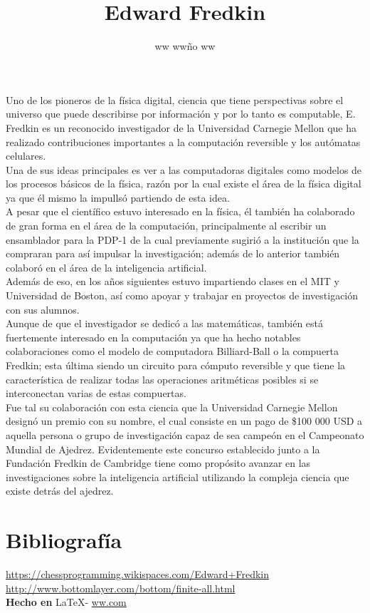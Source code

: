 \documentclass{article}
\title{Edward Fredkin}
\author{ww ww\~no ww}
\date{} %
\begin{document}
	\maketitle
	\normalsize{
Uno de los pioneros de la física digital, ciencia que tiene perspectivas sobre el universo que puede describirse por información y por lo tanto es computable, E. Fredkin es un reconocido investigador de la Universidad Carnegie Mellon que ha realizado contribuciones importantes a la computación reversible y los autómatas celulares.
\\

Una de sus ideas principales es ver a las computadoras digitales como modelos de los procesos básicos de la física, razón por la cual existe el área de la física digital ya que él mismo la impullsó partiendo de esta idea.
\\

A pesar que el científico estuvo interesado en la física, él también ha colaborado de gran forma en el área de la computación, principalmente al escribir un ensamblador para la PDP-1 de la cual previamente sugirió a la institución que la compraran para así impulsar la investigación; además de lo anterior también colaboró en el área de la inteligencia artificial.
\\

Además de eso, en los años siguientes estuvo impartiendo clases en el MIT y Universidad de Boston, así como apoyar y trabajar en proyectos de investigación con sus alumnos.
\\

Aunque de que el investigador se dedicó a las matemáticas, también está fuertemente interesado en la computación ya que ha hecho notables colaboraciones como el modelo de  computadora Billiard-Ball o la compuerta Fredkin; esta última siendo un circuito para cómputo reversible y que tiene la característica de realizar todas las operaciones aritméticas posibles si se interconectan varias de estas compuertas.
\\

Fue tal su colaboración con esta ciencia que la Universidad Carnegie Mellon designó un premio con su nombre, el cual consiste en un pago de \$100 000 USD a aquella persona o grupo de investigación capaz de sea campeón en el Campeonato Mundial de Ajedrez. Evidentemente este concurso establecido junto a la Fundación Fredkin de Cambridge tiene como propósito avanzar en las investigaciones sobre la inteligencia artificial utilizando la compleja ciencia que existe detrás del ajedrez.
}

\vspace{1cm}

\section*{Bibliograf\'ia}

\noindent \url{https://chessprogramming.wikispaces.com/Edward+Fredkin}
\\
\noindent \url{http://www.bottomlayer.com/bottom/finite-all.html}
\\

\large{\hfill \textbf{Hecho en } \LaTeX - \url{ww.com}}
\end{document}
